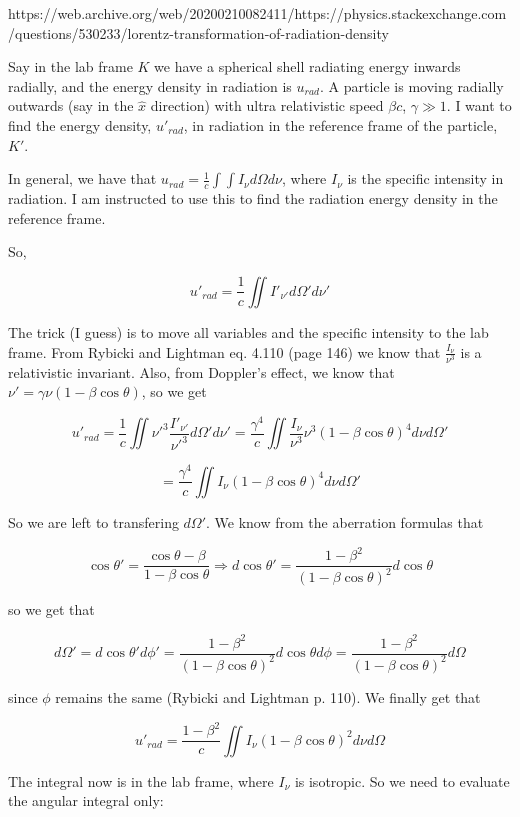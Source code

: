 \documentclass {article}
\begin{document}
	
	https://web.archive.org/web/20200210082411/https://physics.stackexchange.com/questions/530233/lorentz-transformation-of-radiation-density


Say in the lab frame $K$ we have a spherical shell radiating energy inwards radially, and the energy density in radiation is $u_{rad}$. A particle is moving radially outwards (say in the $\hat{x}$ direction) with ultra relativistic speed $\beta c$, $\gamma \gg 1$. I want to find the energy density, $u'_{rad}$, in radiation in the reference frame of the particle, $K'$.

In general, we have that $u_{rad} = \frac{1}{c}\int\int I_\nu d\Omega d\nu$, where $I_\nu$ is the specific intensity in radiation. I am instructed to use this to find the radiation energy density in the reference frame.

So, 

$$ u'_{rad} = \frac{1}{c}\iint I'_{\nu'}d\Omega'd\nu' $$ 

The trick (I guess) is to move all variables and the specific intensity to the lab frame. From Rybicki and Lightman eq. 4.110 (page 146) we know that $\frac{I_\nu}{\nu^3}$ is a relativistic invariant. Also, from Doppler's effect, we know that $\nu' = \gamma\nu\left(1-\beta\cos\theta\right)$, so we get 

$$ u'_{rad} = \frac{1}{c}\iint {\nu'}^3\frac{I'_{\nu'}}{{\nu'}^3}d\Omega'd\nu' = \frac{\gamma^4}{c}\iint \frac{I_\nu}{\nu^3}\nu^3\left(1-\beta\cos\theta\right)^4d\nu d\Omega' $$ 

$$ = \frac{\gamma^4}{c}\iint I_\nu\left(1-\beta\cos\theta\right)^4d\nu d\Omega' $$ 

So we are left to transfering $d\Omega'$. We know from the aberration formulas that

 $$ \cos\theta' = \frac{\cos\theta-\beta}{1-\beta\cos\theta} \Rightarrow d\cos\theta' = \frac{1-\beta^2}{\left(1-\beta\cos\theta\right)^2}d\cos\theta $$ 
 
 so we get that 
 
 $$ d\Omega' = d\cos\theta'd\phi' = \frac{1-\beta^2}{\left(1-\beta\cos\theta\right)^2}d\cos\theta d\phi = \frac{1-\beta^2}{(1-\beta\cos\theta)^2}d\Omega $$
 
  since $\phi$ remains the same (Rybicki and Lightman p. 110). We finally get that
  
   $$ u'_{rad} = \frac{1-\beta^2}{c}\iint I_\nu\left(1-\beta\cos\theta\right)^2d\nu d\Omega $$ 
   
   The integral now is in the lab frame, where $I_\nu$ is isotropic. So we need to evaluate the angular integral only: 
   
\end{document}
